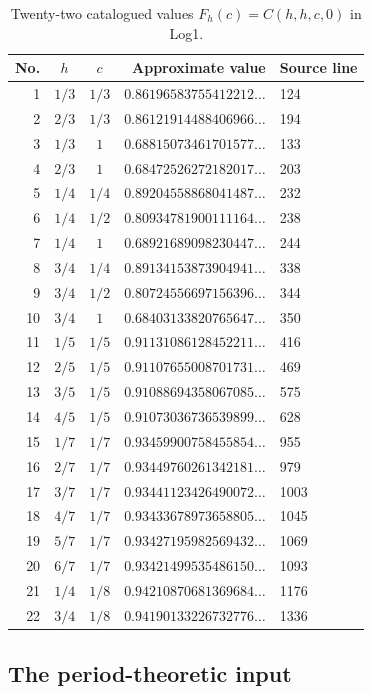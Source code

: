 \documentclass[11pt,a4paper]{article}
\theoremstyle{definition}
\theoremstyle{remark}
\numberwithin{equation}{section}
\begin{document}
\begin{table}[htbp]
\centering\small
\caption{Twenty-two catalogued values $F_h(c)=C(h,h,c,0)$ in Log1.}
\label{log1-table}
\begin{tabular}{rccrl}
\toprule
No. & $h$ & $c$ & Approximate value & Source line\\
\midrule
1 & $1/3$ & $1/3$ & $0.86196583755412212\ldots$ &124\\
2 & $2/3$ & $1/3$ & $0.86121914488406966\ldots$ &194\\
3 & $1/3$ & $1$ & $0.68815073461701577\ldots$ &133\\
4 & $2/3$ & $1$ & $0.68472526272182017\ldots$ &203\\
5 & $1/4$ & $1/4$ & $0.89204558868041487\ldots$ &232\\
6 & $1/4$ & $1/2$ & $0.80934781900111164\ldots$ &238\\
7 & $1/4$ & $1$ & $0.68921689098230447\ldots$ &244\\
8 & $3/4$ & $1/4$ & $0.89134153873904941\ldots$ &338\\
9 & $3/4$ & $1/2$ & $0.80724556697156396\ldots$ &344\\
10 & $3/4$ & $1$ & $0.68403133820765647\ldots$ &350\\
11 & $1/5$ & $1/5$ & $0.91131086128452211\ldots$ &416\\
12 & $2/5$ & $1/5$ & $0.91107655008701731\ldots$ &469\\
13 & $3/5$ & $1/5$ & $0.91088694358067085\ldots$ &575\\
14 & $4/5$ & $1/5$ & $0.91073036736539899\ldots$ &628\\
15 & $1/7$ & $1/7$ & $0.93459900758455854\ldots$ &955\\
16 & $2/7$ & $1/7$ & $0.93449760261342181\ldots$ &979\\
17 & $3/7$ & $1/7$ & $0.93441123426490072\ldots$ &1003\\
18 & $4/7$ & $1/7$ & $0.93433678973658805\ldots$ &1045\\
19 & $5/7$ & $1/7$ & $0.93427195982569432\ldots$ &1069\\
20 & $6/7$ & $1/7$ & $0.93421499535486150\ldots$ &1093\\
21 & $1/4$ & $1/8$ & $0.94210870681369684\ldots$ &1176\\
22 & $3/4$ & $1/8$ & $0.94190133226732776\ldots$ &1336\\
\bottomrule
\end{tabular}
\end{table}

\subsection{The period-theoretic input}
\end{document}
